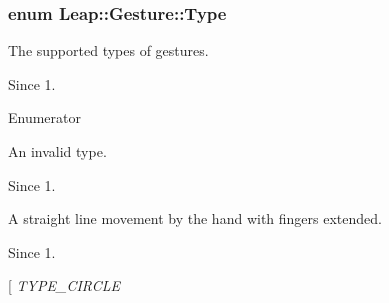 \hypertarget{class_leap_1_1_gesture_a6fa6dd4f28c502f0d55abc6b71c6f9b1}{
\subsubsection[{Type}]{\setlength{\rightskip}{0pt plus 5cm}enum {\bf Leap\+::\+Gesture\+::\+Type}}}\label{class_leap_1_1_gesture_a6fa6dd4f28c502f0d55abc6b71c6f9b1}
The supported types of gestures. \begin{DoxySince}{Since}
1. 
\end{DoxySince}
\begin{Desc}
\item[Enumerator]\par
\begin{description}
\item[{\em 
\hypertarget{class_leap_1_1_gesture_a6fa6dd4f28c502f0d55abc6b71c6f9b1a743fdf6ff0a893a5b7bf6a56739af618}{T\+Y\+P\+E\+\_\+\+I\+N\+V\+A\+L\+I\+D}\label{class_leap_1_1_gesture_a6fa6dd4f28c502f0d55abc6b71c6f9b1a743fdf6ff0a893a5b7bf6a56739af618}
}]An invalid type. \begin{DoxySince}{Since}
1. 
\end{DoxySince}
\item[{\em 
\hypertarget{class_leap_1_1_gesture_a6fa6dd4f28c502f0d55abc6b71c6f9b1a0845a054bc76e298900d3bd735d26c9c}{T\+Y\+P\+E\+\_\+\+S\+W\+I\+P\+E}\label{class_leap_1_1_gesture_a6fa6dd4f28c502f0d55abc6b71c6f9b1a0845a054bc76e298900d3bd735d26c9c}
}]A straight line movement by the hand with fingers extended. \begin{DoxySince}{Since}
1. 
\end{DoxySince}
\item[{\em 
\hypertarget{class_leap_1_1_gesture_a6fa6dd4f28c502f0d55abc6b71c6f9b1a32c2a26d674d97f9c9b2e72569ff6869}{T\+Y\+P\+E\+\_\+\+C\+I\+R\+C\+L\+E}\label{class_leap_1_1_gesture_a6fa6dd4f28c502f0d55abc6b71c6f9b1a32c2a26d674d97f9c9b2e72569ff6869}
}
\end{description}
\end{Desc}
